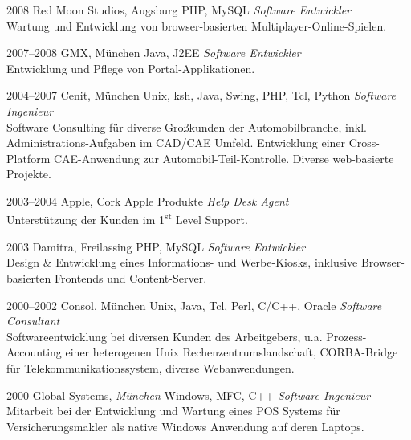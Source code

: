 \documentclass[]{friggeri-cv-a4}
\begin{document}
\begin{entrylist}
\entry
{2008}
{Red Moon Studios, Augsburg}
{PHP, MySQL}
{\emph{Software Entwickler} \\
Wartung und Entwicklung von browser-basierten Multiplayer-Online-Spielen.}
\end{entrylist}


\begin{entrylist}
\entry
{2007--2008}
{GMX, München}
{Java, J2EE}
{\emph{Software Entwickler} \\
Entwicklung und Pflege von Portal-Applikationen.}
\end{entrylist}


\begin{entrylist}
\entry
{2004--2007}
{Cenit, München}
{Unix, ksh, Java, Swing, PHP, Tcl, Python}
{\emph{Software Ingenieur} \\
Software Consulting für diverse Großkunden der Automobilbranche, inkl. Administrations-Aufgaben im CAD/CAE Umfeld. Entwicklung einer Cross-Platform CAE-Anwendung zur Automobil-Teil-Kontrolle. Diverse web-basierte Projekte.}
\end{entrylist}


\begin{entrylist}
\entry
{2003--2004}
{Apple, Cork}
{Apple Produkte}
{\emph{Help Desk Agent} \\
Unterstützung der Kunden im 1\textsuperscript{st} Level Support.}
\end{entrylist}

\begin{entrylist}
\entry
{2003}
{Damitra, Freilassing}
{PHP, MySQL}
{\emph{Software Entwickler} \\
Design \& Entwicklung eines Informations- und Werbe-Kiosks, inklusive Browser-basierten Frontends und Content-Server.}
\end{entrylist}

\begin{entrylist}
\entry
{2000--2002}
{Consol, München}
{Unix, Java, Tcl, Perl, C/C++, Oracle}
{\emph{Software Consultant} \\
Softwareentwicklung bei diversen Kunden des Arbeitgebers, u.a. Prozess-Accounting einer heterogenen Unix Rechenzentrumslandschaft, CORBA-Bridge für Telekommunikationssystem, diverse Webanwendungen.}
\end{entrylist}

\begin{entrylist}
\entry
{2000}
{Global Systems, \emph{München}}
{Windows, MFC, C++}
{\emph{Software Ingenieur} \\
Mitarbeit bei der Entwicklung und Wartung eines POS Systems für Versicherungsmakler als native Windows Anwendung auf deren Laptops.}
\end{entrylist}
\end{document}
